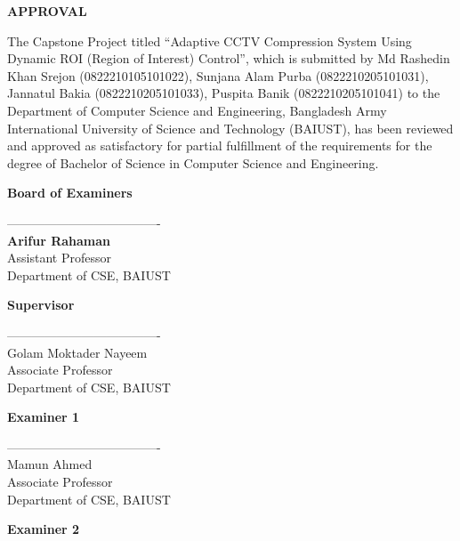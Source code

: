 \clearpage
\thispagestyle{plain}
\begin{center}
    \textbf{\Large APPROVAL}
\end{center}
\vspace{0.5cm}

\noindent
\noindent
\noindent
The Capstone Project titled ``Adaptive CCTV Compression System Using Dynamic ROI (Region of Interest) Control'', which is submitted by Md Rashedin Khan Srejon (0822210105101022), Sunjana Alam Purba (0822210205101031), Jannatul Bakia (0822210205101033), Puspita Banik (0822210205101041) to the Department of Computer Science and Engineering, Bangladesh Army International University of 
Science and Technology (BAIUST), has been reviewed and approved as satisfactory 
for partial fulfillment of the requirements for the degree of Bachelor of Science in 
Computer Science and Engineering.

\vspace{0.5cm}
\begin{center}
    \textbf{Board of Examiners}
\end{center}
\vspace{1.5cm}

\noindent
\begin{minipage}[t]{0.6\textwidth}
    ------------------------------------- \\
    \textbf{Arifur Rahaman} \\
    Assistant Professor \\
    Department of CSE, BAIUST
\end{minipage}
\hfill
\begin{minipage}[t]{0.35\textwidth}
    \raggedleft
    \textbf{Supervisor}
\end{minipage}

\vspace{1.8cm}
\noindent
\begin{minipage}[t]{0.6\textwidth}
      ------------------------------------- \\
    Golam Moktader Nayeem \\
    Associate Professor \\
    Department of CSE, BAIUST
\end{minipage}
\hfill
\begin{minipage}[t]{0.35\textwidth}
    \raggedleft
    \textbf{Examiner 1}
\end{minipage}

\vspace{1.8cm}
\noindent
\begin{minipage}[t]{0.6\textwidth}
      ------------------------------------- \\
    Mamun Ahmed \\
    Associate Professor \\
    Department of CSE, BAIUST
\end{minipage}
\hfill
\begin{minipage}[t]{0.35\textwidth}
    \raggedleft
    \textbf{Examiner 2}
\end{minipage}

